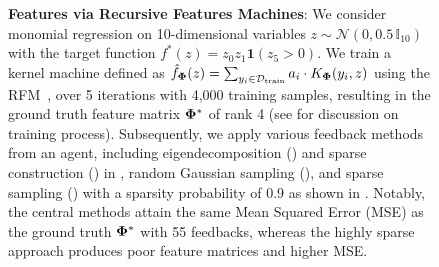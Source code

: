 \begin{figure*}[t!]
{%
\textbf{Features via Recursive Features Machines}: We consider monomial regression on 10-dimensional variables \( z \sim \mathcal{N}(0, 0.5\, \mathbb{I}_{10}) \) with the target function \( f^*(z) = z_0 z_1 \mathbf{1}(z_5 > 0) \). 
We train a kernel machine defined as \( \hat{f}_{\boldsymbol{\Phi}}(z) = \sum_{y_i \in \mathcal{D}_{\text{train}}} a_i \cdot K_{\boldsymbol{\Phi}}(y_i, z) \) using the RFM~\citep{rfm}, over 5 iterations with 4,000 training samples, resulting in the ground truth feature matrix \( \boldsymbol{\Phi}^* \) of rank 4 (see  for discussion on training process). 
Subsequently, we apply various feedback methods from an agent, including eigendecomposition () and sparse construction () in  , random Gaussian sampling (), and sparse sampling () with a sparsity probability of 0.9 as shown in . Notably, the central methods attain the same Mean Squared Error (MSE) as the ground truth \( \boldsymbol{\Phi}^* \) with 55 feedbacks, whereas the highly sparse approach produces poor feature matrices and higher MSE.
}
    

\end{figure*}
